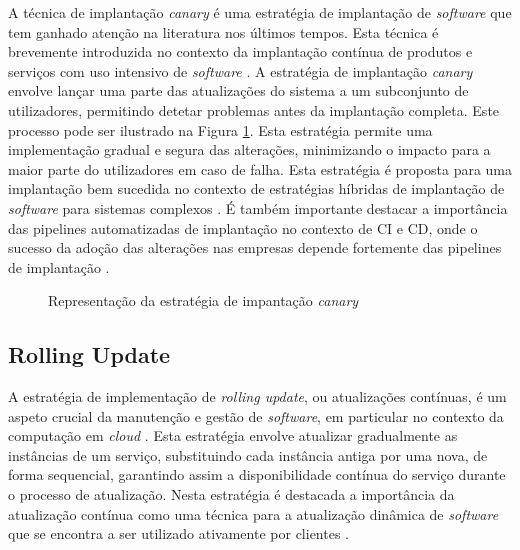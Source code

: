 A técnica de implantação \textit{canary} é uma estratégia de implantação de \textit{software} que 
tem ganhado atenção na literatura nos últimos tempos. Esta técnica é brevemente introduzida no 
contexto da implantação contínua de produtos e serviços com uso intensivo de \textit{software} \cite{canary2017}. 
A estratégia de implantação \textit{canary} envolve lançar uma parte das atualizações do sistema a 
um subconjunto de utilizadores, permitindo detetar problemas antes da implantação completa.
Este processo pode ser ilustrado na Figura \ref{fig:canary}. Esta estratégia permite uma 
implementação gradual e segura das alterações, minimizando o impacto para a maior parte do 
utilizadores em caso de falha. Esta estratégia é proposta para uma implantação bem sucedida no 
contexto de estratégias híbridas de implantação de \textit{software} para sistemas complexos 
\cite{canary2022}. É também importante destacar a importância das \glspl{pipeline} automatizadas 
de implantação no contexto de \ac{CI} e \ac{CD}, onde o sucesso da adoção das alterações nas 
empresas depende fortemente das \glspl{pipeline} de implantação \cite{canary2017b}. 

\begin{figure}[H]
    \centering
    \qquad
    \caption{Representação da estratégia de impantação \textit{canary}}%
    \label{fig:canary}%
\end{figure}

\subsection{Rolling Update}

A estratégia de implementação de \textit{rolling update}, ou atualizações contínuas, é um aspeto 
crucial da manutenção e gestão de \textit{software}, em particular no contexto da computação em 
\textit{cloud} \cite{rolling2014}. Esta estratégia envolve atualizar gradualmente as instâncias de 
um serviço, substituindo cada instância antiga por uma nova, de forma sequencial, garantindo assim 
a disponibilidade contínua do serviço durante o processo de atualização. Nesta estratégia é destacada 
a importância da atualização contínua como uma técnica para a atualização dinâmica de \textit{software} 
que se encontra a ser utilizado ativamente por clientes \cite{rolling2014}. 

